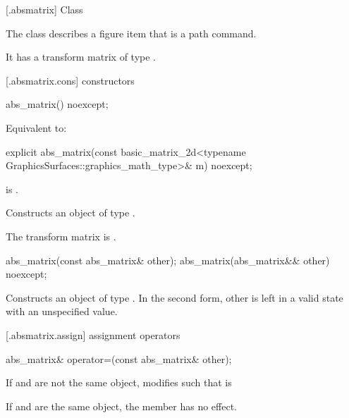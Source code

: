  [\iotwod.absmatrix] {Class }%

\pnum
{}%
The class  describes a figure item that is a path command.

\pnum
It has a transform matrix of type .

 [\iotwod.absmatrix.cons] { constructors}

%
\begin{itemdecl}
abs_matrix() noexcept;
\end{itemdecl}
\begin{itemdescr}
\pnum
\effects
Equivalent to: 
\end{itemdescr}

%
\begin{itemdecl}
explicit abs_matrix(const basic_matrix_2d<typename
  GraphicsSurfaces::graphics_math_type>& m) noexcept;
\end{itemdecl}
\begin{itemdescr}
\pnum
\requires
{} is .

\pnum
\effects
Constructs an object of type .

\pnum
The transform matrix is .
\end{itemdescr}

%
\begin{itemdecl}
abs_matrix(const abs_matrix& other);
abs_matrix(abs_matrix&& other) noexcept;
\end{itemdecl}
\begin{itemdescr}
\pnum
\effects
Constructs an object of type . In the second form, other is left in a valid state with an unspecified value.
\end{itemdescr}

 [\iotwod.absmatrix.assign] { assignment operators}

%
\begin{itemdecl}
abs_matrix& operator=(const abs_matrix& other);
\end{itemdecl}
\begin{itemdescr}
\pnum
\effects
If  and  are not the same object, modifies  such that  is 

\pnum
If  and  are the same object, the member has no effect.

\pnum
\returns
{}
\end{itemdescr}

